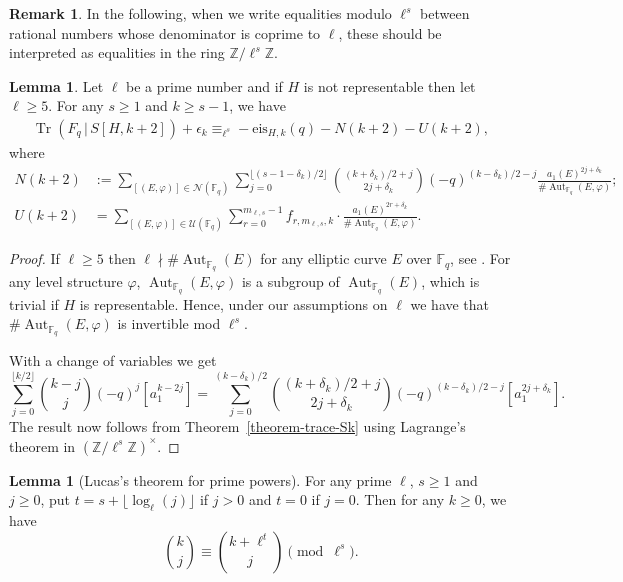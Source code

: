 \documentclass[10pt]{article}
\theoremstyle{definition}
\newtheorem{lemma}[theorem]{Lemma}
\newtheorem{remark}[theorem]{Remark}
\let\phi\varphi
\DeclareMathOperator\Aut{Aut}
\DeclareMathOperator\Tr{Tr}
\renewcommand{\:}{\colon}
\newcommand{\bF}{\mathbb{F}}
\newcommand{\F}{\mathbb{F}}
\begin{document}
\begin{remark} In the following, when we write equalities modulo $\ell^s$ between rational numbers whose denominator is coprime to $\ell$, these should be interpreted as equalities in the ring $\mathbb Z/\ell^s\mathbb Z$. 
\end{remark}


\begin{lemma}\label{lem:trace_formula_modulo}
    Let $\ell$ be a prime number and if $H$ is not representable then let $\ell \geq 5$. For any 
    $s \geq 1$ and $k \geq s-1$, we have 
    \begin{align*}
    \Tr(F_q \, | \, S[H,k+2])+\epsilon_k \equiv_{\ell^s} -\mathrm{eis}_{H,k}(q) - N(k+2) - U(k+2),
    \end{align*}
    where
    \begin{align}\label{eq:N(k+2)}
   N(k+2) &:= \sum_{[(E,\phi)] \in \mathcal N(\bF_q)} \sum_{j=0}^{\lfloor (s-1-\delta_k)/2\rfloor} \binom{(k+\delta_k)/2+j}{2j+\delta_k} (-q)^{(k-\delta_k)/2 - j} \frac{a_1(E)^{2j+\delta_k}}{\# \Aut_{\F_q}(E,\phi)}; \\
    \label{eq:U(k+2)}
    U(k+2) &= \sum_{[(E,\phi)] \in \mathcal U(\bF_q)} \sum_{r=0}^{m_{\ell,s}-1} f_{r,m_{\ell,s},k} \cdot \frac{a_1(E)^{2r+\delta_k}}{\# \Aut_{\F_q}(E,\phi)}.
    \end{align}
\end{lemma}

\begin{proof}
    If $\ell \geq 5$ then $\ell \nmid \# \Aut_{\F_q}(E)$ for any elliptic curve $E$ over $\mathbb F_q$, see \cite[Theorem 10.1]{silverman}. For any level structure $\phi$, $\Aut_{\F_q}(E,\phi)$ is a subgroup of $\Aut_{\F_q}(E)$, which is trivial if $H$ is representable. Hence, under our assumptions on $\ell$ we have that $\# \Aut_{\F_q}(E,\phi)$ is invertible mod $\ell^s$.

    With a change of variables we get
\[
 \sum_{j=0}^{\lfloor k/2 \rfloor} \binom{k-j}{j} (-q)^{j}[a_1^{k-2j}]=
 \sum_{j=0}^{(k-\delta_k)/2} \binom{(k+\delta_k)/2+j}{2j+\delta_k} (-q)^{(k-\delta_k)/2-j}[a_1^{2j+\delta_k}].
\]
    The result now follows
    from Theorem~\ref{theorem-trace-Sk} using
    Lagrange's theorem in $(\mathbb Z/\ell^s\mathbb Z)^\times$. 
\end{proof}

\begin{lemma}[Lucas's theorem for prime powers]\label{lem:lucas}
    For any prime $\ell$, $s \geq 1$ and $j \geq 0$, put $t = s + \lfloor \log_{\ell}(j)\rfloor$ if $j > 0$ and $t = 0$ if $j = 0$. Then for any $k \geq 0$, we have
    \[
    \binom{k}{j} \equiv \binom{k+\ell^t}{j} \pmod{\ell^s}.
    \]
\end{lemma}
\end{document}
